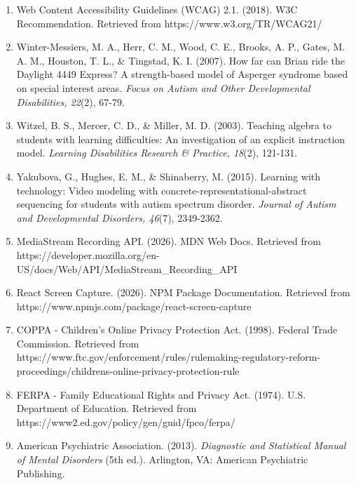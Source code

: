 \documentclass[12pt, a4paper]{article}
\begin{document}
\begin{enumerate}[leftmargin=*]
    \item Web Content Accessibility Guidelines (WCAG) 2.1. (2018). W3C Recommendation. Retrieved from https://www.w3.org/TR/WCAG21/
    
    \item Winter-Messiers, M. A., Herr, C. M., Wood, C. E., Brooks, A. P., Gates, M. A. M., Houston, T. L., \& Tingstad, K. I. (2007). How far can Brian ride the Daylight 4449 Express? A strength-based model of Asperger syndrome based on special interest areas. \textit{Focus on Autism and Other Developmental Disabilities, 22}(2), 67-79.
    
    \item Witzel, B. S., Mercer, C. D., \& Miller, M. D. (2003). Teaching algebra to students with learning difficulties: An investigation of an explicit instruction model. \textit{Learning Disabilities Research \& Practice, 18}(2), 121-131.
    
    \item Yakubova, G., Hughes, E. M., \& Shinaberry, M. (2015). Learning with technology: Video modeling with concrete-representational-abstract sequencing for students with autism spectrum disorder. \textit{Journal of Autism and Developmental Disorders, 46}(7), 2349-2362.
    
    \item MediaStream Recording API. (2026). MDN Web Docs. Retrieved from https://developer.mozilla.org/en-US/docs/Web/API/MediaStream\_Recording\_API
    
    \item React Screen Capture. (2026). NPM Package Documentation. Retrieved from https://www.npmjs.com/package/react-screen-capture
    
    \item COPPA - Children's Online Privacy Protection Act. (1998). Federal Trade Commission. Retrieved from https://www.ftc.gov/enforcement/rules/rulemaking-regulatory-reform-proceedings/childrens-online-privacy-protection-rule
    
    \item FERPA - Family Educational Rights and Privacy Act. (1974). U.S. Department of Education. Retrieved from https://www2.ed.gov/policy/gen/guid/fpco/ferpa/
    
    \item American Psychiatric Association. (2013). \textit{Diagnostic and Statistical Manual of Mental Disorders} (5th ed.). Arlington, VA: American Psychiatric Publishing.
\end{enumerate}
\end{document}
